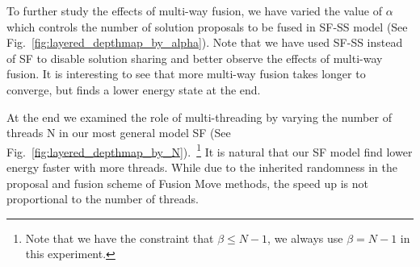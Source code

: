 %
To further study the effects of multi-way fusion, we have varied the
value of $\alpha$ which controls the number of solution proposals to be
fused in SF-SS model (See
Fig.~\ref{fig:layered_depthmap_by_alpha}). Note that we have used SF-SS
instead of SF to disable solution sharing and better observe the effects
of multi-way fusion.
It is interesting to see that more multi-way fusion takes longer to
converge, but finds a lower energy state at the end.

At the end we examined the role of multi-threading by varying the number of threads N in our most general model SF (See Fig.~\ref{fig:layered_depthmap_by_N}).~\footnote{Note that we have the constraint that $\beta \leq N-1$, we always use $\beta = N-1$ in this experiment.}  It is natural that our SF model find lower energy faster with more threads. While due to the inherited randomness in the proposal and fusion scheme of Fusion Move methods, the speed up is not proportional to the number of threads.
